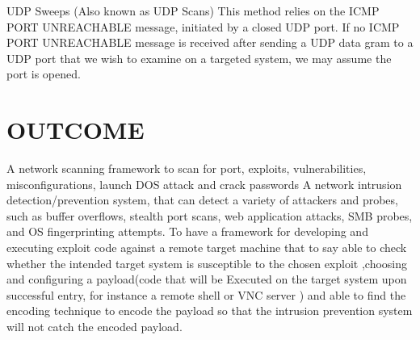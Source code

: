 \documentclass{article}
\begin{document}
UDP Sweeps (Also known as UDP Scans)
This method relies on the ICMP PORT UNREACHABLE message, initiated by a closed UDP
port. If no ICMP PORT UNREACHABLE message is received after sending a UDP data gram
to a UDP port that we wish to examine on a targeted system, we may assume the port is
opened.

\section{OUTCOME}\label{sec:into}

A network scanning  framework  to scan for port, exploits, vulnerabilities, misconfigurations, launch DOS attack and crack passwords
A network intrusion detection/prevention system, that can detect a variety of attackers and probes, such as buffer overflows, stealth port scans, web application attacks, SMB probes, and OS fingerprinting attempts. 
To have a framework for developing and executing  exploit  code against  a remote target machine  that to say able to check whether the intended target system is susceptible to the chosen exploit ,choosing and configuring a payload(code that will be Executed on the target system upon successful  entry, for instance a remote  shell or VNC server ) and able to find the encoding technique to encode  the payload so that the intrusion prevention system will not catch the encoded payload.
\end{document}
